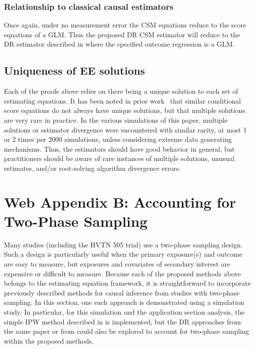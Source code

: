 \documentclass[12pt]{article}
\begin{document}
\subsubsection{Relationship to classical causal estimators}

Once again, under no measurement error the CSM equations reduce to the score equations of a GLM. Thus the proposed DR CSM estimator will reduce to the DR estimator described in \citet{hirano2001} where the specified outcome regression is a GLM.

\subsection{Uniqueness of EE solutions}

Each of the proofs above relies on there being a unique solution to each set of estimating equations. It has been noted in prior work~\citep{stefanski1987} that similar conditional score equations do not always have unique solutions, but that multiple solutions are very rare in practice. In the various simulations of this paper, multiple solutions or estimator divergence were encountered with similar rarity, at most 1 or 2 times per 2000 simulations, unless considering extreme data generating mechanisms. Thus, the estimators should have good behavior in general, but practitioners should be aware of rare instances of multiple solutions, unusual estimates, and/or root-solving algorithm divergence errors.

\section{Web Appendix B: Accounting for Two-Phase Sampling}

Many studies (including the HVTN 505 trial) use a two-phase sampling design. Such a design is particularly useful when the primary exposure(s) and outcome are easy to measure, but exposures and covariates of secondary interest are expensive or difficult to measure. Because each of the proposed methods above belongs to the estimating equation framework, it is straightforward to incorporate previously described methods for causal inference from studies with two-phase sampling. In this section, one such approach is demonstrated using a simulation study. In particular, for this simulation and the application section analysis, the simple IPW method described in \citet{wang2009} is implemented, but the DR approaches from the same paper or from \citet{rose2011} could also be explored to account for two-phase sampling within the proposed methods.
\end{document}
